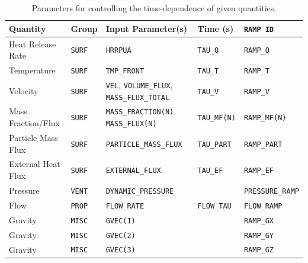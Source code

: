 \documentclass[11pt]{book}
\newcommand{\ct}{\tt\small}
\begin{document}
\begin{table}[ht]
\label{tau_table}
\caption[Parameters used to control time-dependence.]{Parameters for controlling the time-dependence of given quantities.}
\begin{tabular}{|l|l|l|l|l|}
\hline
Quantity            & Group             & Input Parameter(s)                                            & Time (s)                          & {\ct RAMP ID}              \\ \hline \hline
Heat Release Rate   & {\ct SURF}        & {\ct HRRPUA}                                                  & {\ct TAU\_Q}                      & {\ct RAMP\_Q}              \\ \hline
Temperature         & {\ct SURF}        & {\ct TMP\_FRONT}                                              & {\ct TAU\_T}                      & {\ct RAMP\_T}              \\ \hline
Velocity            & {\ct SURF}        & {\ct VEL}, {\ct VOLUME\_FLUX}, {\ct MASS\_FLUX\_TOTAL}        & {\ct TAU\_V}                      & {\ct RAMP\_V}              \\ \hline
Mass Fraction/Flux  & {\ct SURF}        & {\ct MASS\_FRACTION(N)}, {\ct MASS\_FLUX(N)}                  & {\ct TAU\_MF(N)}                  & {\ct RAMP\_MF(N)}          \\ \hline
Particle Mass Flux  & {\ct SURF}        & {\ct PARTICLE\_MASS\_FLUX}                                    & {\ct TAU\_PART}                   & {\ct RAMP\_PART}           \\ \hline
External Heat Flux  & {\ct SURF}        & {\ct EXTERNAL\_FLUX}                                          & {\ct TAU\_EF}                     & {\ct RAMP\_EF}             \\ \hline
Pressure            & {\ct VENT}        & {\ct DYNAMIC\_PRESSURE}                                       &                                   & {\ct PRESSURE\_RAMP}       \\ \hline
Flow                & {\ct PROP}        & {\ct FLOW\_RATE}                                              & {\ct FLOW\_TAU}                   & {\ct FLOW\_RAMP}           \\ \hline
Gravity             & {\ct MISC}        & {\ct GVEC(1)}                                                 &                                   & {\ct RAMP\_GX}             \\ \hline
Gravity             & {\ct MISC}        & {\ct GVEC(2)}                                                 &                                   & {\ct RAMP\_GY}             \\ \hline
Gravity             & {\ct MISC}        & {\ct GVEC(3)}                                                 &                                   & {\ct RAMP\_GZ}             \\ \hline
\end{tabular}
\end{table}
\end{document}

